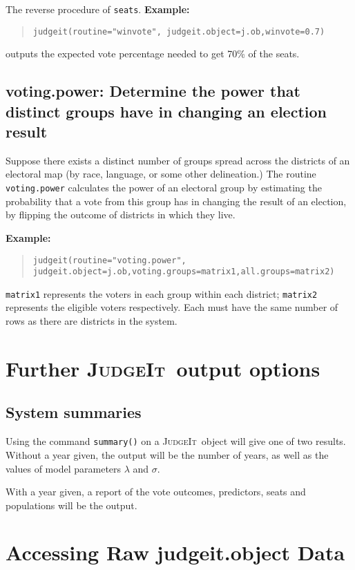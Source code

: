 \documentclass[oneside,letterpaper,titlepage]{article}
\newcommand{\JudgeIt}{\textsc{JudgeIt}\ }
\begin{document}
The reverse procedure of \texttt{seats}. \textbf{Example:}
\begin{quote} \texttt{judgeit(routine="winvote", judgeit.object=j.ob,winvote=0.7)} \end{quote}
outputs the expected vote percentage needed to get 70\% of the seats.

\subsection{voting.power: Determine the power that distinct groups have in changing an election result}

Suppose there exists a distinct number of groups spread across the districts of an electoral map (by race, language, or some other delineation.) The routine \texttt{voting.power} calculates the power of an electoral group by estimating the probability that a vote from this group has in changing the result of an election, by flipping the outcome of districts in which they live.

\textbf{Example:}
\begin{quote} \texttt{judgeit(routine="voting.power", judgeit.object=j.ob,voting.groups=matrix1,all.groups=matrix2)} \end{quote}

\texttt{matrix1} represents the voters in each group within each district; \texttt{matrix2} represents the eligible voters respectively. Each must have the same number of rows as there are districts in the system.

\section{Further \JudgeIt output options}

\subsection{System summaries}

Using the command \texttt{summary()} on a \JudgeIt object will give one
of two results. Without a year given, the output will be the number of
years, as well as the values of model parameters $\lambda$ and
$\sigma$.

With a year given, a report of the vote outcomes, predictors, seats
and populations will be the output.

\section{Accessing Raw judgeit.object Data}
\end{document}
